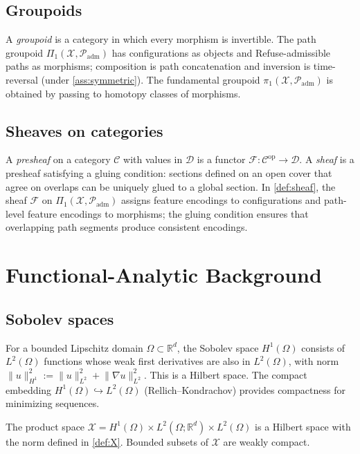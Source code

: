 \documentclass[12pt, oneside]{memoir}
\newcommand{\X}{\mathcal{X}}
\newcommand{\Padm}{\mathcal{P}_{\mathrm{adm}}}
\newcommand{\nnorm}[1]{\lVert #1 \rVert}
\begin{document}
\section{Groupoids}

A \emph{groupoid} is a category in which every morphism is invertible.  The path
groupoid $\Pi_1(\X, \Padm)$ has configurations as objects and Refuse-admissible paths as
morphisms; composition is path concatenation and inversion is time-reversal (under
\cref{ass:symmetric}).  The fundamental groupoid $\pi_1(\X, \Padm)$ is obtained by
passing to homotopy classes of morphisms.

\section{Sheaves on categories}

A \emph{presheaf} on a category $\mathcal{C}$ with values in $\mathcal{D}$ is a functor
$\mathcal{F}: \mathcal{C}^{\mathrm{op}} \to \mathcal{D}$.  A \emph{sheaf} is a presheaf
satisfying a gluing condition: sections defined on an open cover that agree on
overlaps can be uniquely glued to a global section.  In \cref{def:sheaf}, the sheaf
$\mathcal{F}$ on $\Pi_1(\X, \Padm)$ assigns feature encodings to configurations and
path-level feature encodings to morphisms; the gluing condition ensures that overlapping
path segments produce consistent encodings.

\chapter{Functional-Analytic Background}
\label{app:functional}

\section{Sobolev spaces}

For a bounded Lipschitz domain $\Omega \subset \mathbb{R}^d$, the Sobolev space
$H^1(\Omega)$ consists of $L^2(\Omega)$ functions whose weak first derivatives are also
in $L^2(\Omega)$, with norm $\nnorm{u}_{H^1}^2 := \nnorm{u}_{L^2}^2 +
\nnorm{\nabla u}_{L^2}^2$.  This is a Hilbert space.  The compact embedding $H^1(\Omega)
\hookrightarrow L^2(\Omega)$ (Rellich--Kondrachov) provides compactness for minimizing
sequences.

The product space $\X = H^1(\Omega) \times L^2(\Omega;\mathbb{R}^d) \times L^2(\Omega)$
is a Hilbert space with the norm defined in \cref{def:X}.  Bounded subsets of $\X$ are
weakly compact.
\end{document}
